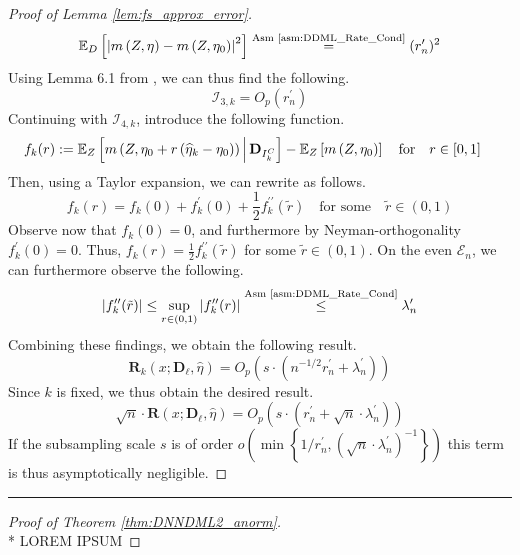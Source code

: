 \begin{proof}[Proof of Lemma \ref{lem:fs_approx_error}]
\begin{equation}
\begin{aligned}
            \mathbb{E}_{D}\left[\left|m\left(Z, \eta\right) - m\left(Z, \eta_{0}\right)\right|^{2}\right]
            \overset{\text{Asm \ref{asm:DDML_Rate_Cond}}}{=} (r_{n}^{\prime})^{2}
        \end{aligned}
    \end{equation}
    Using Lemma 6.1 from \citet{chernozhukov_doubledebiased_2018}, we can thus find the following.
    \begin{equation}
        \mathcal{I}_{3,k} = O_{p}(r_{n}^{\prime})
    \end{equation}
    Continuing with $\mathcal{I}_{4,k}$, introduce the following function.
    \begin{equation}
        \begin{aligned}
            f_{k}(r) 
            & := \mathbb{E}_{Z}\left[m\left(Z, \eta_{0} + r \left(\widehat{\eta}_{k} - \eta_{0}\right)\right) \, \middle| \, \mathbf{D}_{I_{k}^{C}}\right] - \mathbb{E}_{Z}\left[m\left(Z, \eta_{0}\right) \right] 
            \quad \text{for} \quad r \in [0,1]
        \end{aligned}
    \end{equation}
    Then, using a Taylor expansion, we can rewrite as follows.
    \begin{equation}
        f_{k}(r) = f_{k}(0) + f_{k}^{\prime}(0) + \frac{1}{2} f_{k}^{\prime\prime}(\tilde{r})
        \quad \text{for some} \quad \tilde{r} \in (0,1)
    \end{equation}
    Observe now that $f_{k}(0) = 0$, and furthermore by Neyman-orthogonality $f_{k}^{\prime}(0) = 0$.
    Thus, $f_{k}(r) = \frac{1}{2} f_{k}^{\prime\prime}(\tilde{r})$ for some $\tilde{r} \in (0,1)$.
    On the even $\mathcal{E}_{n}$, we can furthermore observe the following.
    \begin{equation}
        \left| f_{k}^{\prime\prime}(\tilde{r}) \right| 
        \leq \sup_{r \in (0,1)} \left| f_{k}^{\prime\prime}(r) \right|
        \overset{\text{Asm \ref{asm:DDML_Rate_Cond}}}{\leq} \lambda_{n}^{\prime}
    \end{equation}
    Combining these findings, we obtain the following result.
    \begin{equation}
         \mathbf{R}_{k}\left(x; \mathbf{D}_{\ell}, \hat{\eta}\right)
         = O_{p}\left(s \cdot \left(n^{-1/2} r_{n}^{\prime} + \lambda_{n}^{\prime}\right)\right)
    \end{equation}
    Since $k$ is fixed, we thus obtain the desired result.
    \begin{equation}
        \sqrt{n} \cdot \mathbf{R}\left(x; \mathbf{D}_{\ell}, \hat{\eta}\right)
         = O_{p}\left(s \cdot \left(r_{n}^{\prime} + \sqrt{n} \cdot \lambda_{n}^{\prime}\right)\right)
    \end{equation}
    If the subsampling scale $s$ is of order $o\left(\min\left\{1/r_{n}^{\prime}, \left(\sqrt{n} \cdot \lambda_{n}^{\prime}\right)^{-1}\right\}\right)$ this term is thus asymptotically negligible.
\end{proof}

\hrule

\begin{proof}[Proof of Theorem \ref{thm:DNNDML2_anorm}]\mbox{}\\*
    {\color{red} LOREM IPSUM}
\end{proof}
